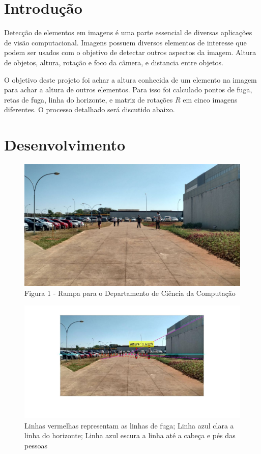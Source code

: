 \documentclass[a4paper, 12pt]{article}
\begin{document}
	\section*{Introdução}

    Detecção de elementos em imagens é uma parte essencial de diversas aplicações de visão computacional. Imagens possuem diversos elementos de interesse que podem ser usados com o objetivo de detectar outros aspectos da imagem. Altura de objetos, altura, rotação e foco da câmera, e distancia entre objetos.

    O objetivo deste projeto foi achar a altura conhecida de um elemento na imagem para achar a altura de outros elementos. Para isso foi calculado pontos de fuga, retas de fuga, linha do horizonte, e matriz de rotações $R$ em cinco imagens diferentes. O processo detalhado será discutido abaixo.

    \section*{Desenvolvimento}

    \begin{figure}[H]
		\centering
		\includegraphics[width=0.68\linewidth]{nolines1.jpeg}
		\caption{Figura 1 - Rampa para o Departamento de Ciência da Computação}
	\end{figure}

    \begin{figure}[H]
		\centering
		\includegraphics[width=0.95\linewidth]{lines1.jpg}
		\caption{Linhas vermelhas representam as linhas de fuga; Linha azul clara a linha do horizonte; Linha azul escura a linha até a cabeça e pés das pessoas}
	\end{figure}
\end{document}
